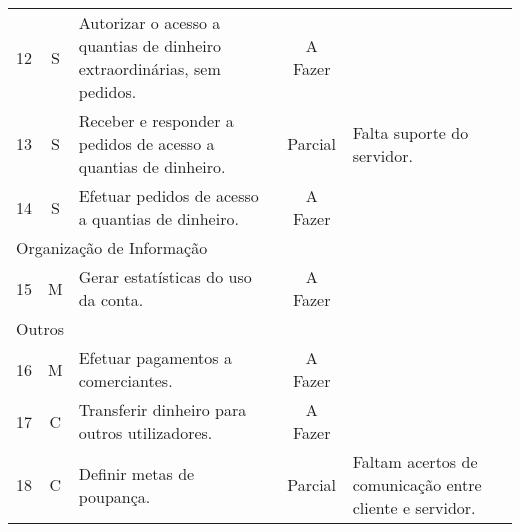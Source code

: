 \begin{center}
\begin{longtable}{@{}lcp{}cp{}@{}}
    12  & S & Autorizar o acesso a quantias de dinheiro extraordinárias, sem pedidos. & A Fazer &  \\
    13  & S & Receber e responder a pedidos de acesso a quantias de dinheiro. & Parcial & Falta suporte do servidor. \\
    14  & S & Efetuar pedidos de acesso a quantias de dinheiro. & A Fazer &  \\
    \multicolumn{5}{l}{\color{gray} Organização de Informação} \\
    15  & M & Gerar estatísticas do uso da conta. & A Fazer &  \\
    \multicolumn{5}{l}{\color{gray} Outros} \\
    16  & M & Efetuar pagamentos a comerciantes. & A Fazer &  \\
    17  & C & Transferir dinheiro para outros utilizadores. & A Fazer &  \\
    18  & C & Definir metas de poupança. & Parcial & Faltam acertos de comunicação entre cliente e servidor.
\end{longtable}
\end{center}


